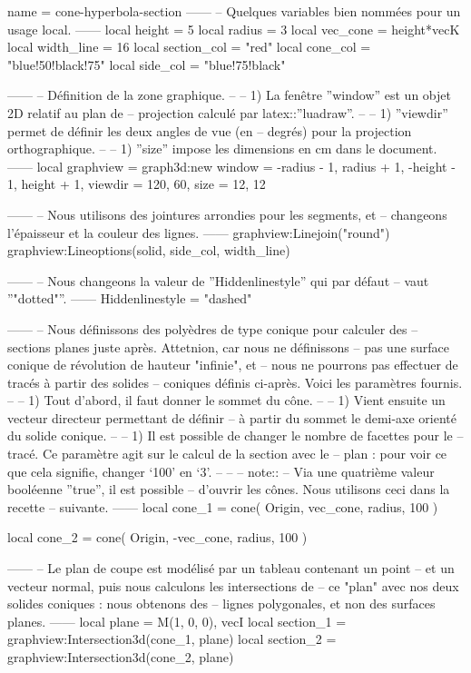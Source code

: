 \documentclass{standalone}
\begin{document}
\begin{luadraw}{name = cone-hyperbola-section}
------
-- Quelques variables bien nommées pour un usage local.
------
local height      =  5
local radius      =  3
local vec_cone    = height*vecK
local width_line  =  16
local section_col = "red"
local cone_col    = "blue!50!black!75"
local side_col    = "blue!75!black"

------
-- Définition de la zone graphique.
--
--     1) La fenêtre ''window'' est un objet 2D relatif au plan de
--     projection calculé par latex::''luadraw''.
--
--     1) ''viewdir'' permet de définir les deux angles de vue (en
--     degrés) pour la projection orthographique.
--
--     1) ''size'' impose les dimensions en cm dans le document.
------
local graphview = graph3d:new{
  window  = {-radius - 1, radius + 1, -height - 1, height + 1},
  viewdir = {120, 60},
  size    = {12, 12}
}

------
-- Nous utilisons des jointures arrondies pour les segments, et
-- changeons l'épaisseur et la couleur des lignes.
------
graphview:Linejoin("round")
graphview:Lineoptions(solid, side_col, width_line)

------
-- Nous changeons la valeur de ''Hiddenlinestyle'' qui par défaut
-- vaut ''"dotted"''.
------
Hiddenlinestyle = "dashed"

------
-- Nous définissons des polyèdres de type conique pour calculer des
-- sections planes juste après. Attetnion, car nous ne définissons
-- pas une surface conique de révolution de hauteur "infinie", et
-- nous ne pourrons pas effectuer de tracés à partir des solides
-- coniques définis ci-après. Voici les paramètres fournis.
--
--     1) Tout d'abord, il faut donner le sommet du cône.
--
--     1) Vient ensuite un vecteur directeur permettant de définir
--     à partir du sommet le demi-axe orienté du solide conique.
--
--     1) Il est possible de changer le nombre de facettes pour le
--     tracé. Ce paramètre agit sur le calcul de la section avec le
--     plan : pour voir ce que cela signifie, changer `100' en `3'.
--
--
-- note::
--     Via une quatrième valeur booléenne ''true'', il est possible
--     d'ouvrir les cônes. Nous utilisons ceci dans la recette
--     suivante.
------
local cone_1 = cone(
  Origin, vec_cone, radius,
  100
)

local cone_2 = cone(
  Origin,  -vec_cone, radius,
  100
)

------
-- Le plan de coupe est modélisé par un tableau contenant un point
-- et un vecteur normal, puis nous calculons les intersections de
-- ce "plan" avec nos deux solides coniques : nous obtenons des
-- lignes polygonales, et non des surfaces planes.
------
local plane     = {M(1, 0, 0), vecI}
local section_1 = graphview:Intersection3d(cone_1, plane)
local section_2 = graphview:Intersection3d(cone_2, plane)


\end{luadraw}
\end{document}
